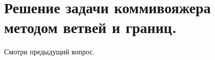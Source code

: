 \documentclass[17pt]{extarticle}
\begin{document}
\section{Решение задачи коммивояжера методом ветвей и границ.}
Смотри предыдущий вопрос.
\end{document}
